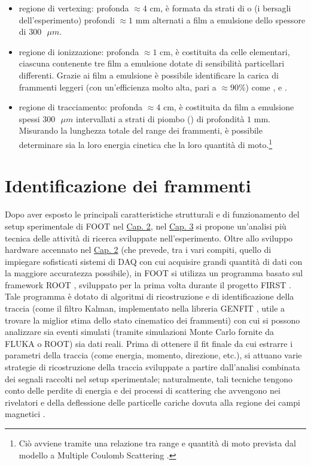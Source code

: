 \documentclass[12pt,a4paper,twoside]{report}
\begin{document}
	\begin{itemize}
		\item regione di vertexing: profonda $\approx4\mbox{ cm}$, è formata da strati di  o  (i bersagli dell'esperimento) profondi $\approx1\mbox{ mm}$ alternati a film a emulsione dello spessore di $300\mbox{ }\mu{m}$.
		\item regione di ionizzazione: profonda $\approx1\mbox{ cm}$, è costituita da celle elementari, ciascuna contenente tre film a emulsione dotate di sensibilità particellari differenti. Grazie ai film a emulsione è possibile identificare la carica di frammenti leggeri (con un'efficienza molto alta, pari a $\approx90\%$) come ,  e  \cite{deLellisConference}.
		\item regione di tracciamento: profonda $\approx4\mbox{ cm}$, è costituita da film a emulsione spessi $300\mbox{ }\mu{m}$ intervallati a strati di piombo () di profondità $1\mbox{ mm}$. Misurando la lunghezza totale del range dei frammenti, è possibile determinare sia la loro energia cinetica che la loro quantità di moto.\footnote{Ciò avviene tramite una relazione tra range e quantità di moto prevista dal modello a Multiple Coulomb Scattering \cite{articleAgafonova,DESERIO2003539}.}
	\end{itemize}
	
	\chapter{Identificazione dei frammenti}\label{cap:3}
	Dopo aver esposto le principali caratteristiche strutturali e di funzionamento del setup sperimentale di FOOT nel \hyperref[cap:2]{Cap. 2}, nel \hyperref[cap:3]{Cap. 3} si propone un'analisi più tecnica delle attività di ricerca sviluppate nell'esperimento. Oltre allo sviluppo hardware accennato nel \hyperref[cap:2]{Cap. 2} (che prevede, tra i vari compiti, quello di impiegare sofisticati sistemi di DAQ con cui acquisire grandi quantità di dati con la maggiore accuratezza possibile), in FOOT si utilizza un programma basato sul framework ROOT \cite{rene_brun}, sviluppato per la prima volta durante il progetto FIRST \cite{foot_cdr}. Tale programma è dotato di algoritmi di ricostruzione e di identificazione della traccia (come il filtro Kalman, implementato nella libreria GENFIT \cite{Rauch_2015}, utile a trovare la miglior stima dello stato cinematico dei frammenti) con cui si possono analizzare sia eventi simulati (tramite simulazioni Monte Carlo fornite da FLUKA o ROOT) sia dati reali. Prima di ottenere il fit finale da cui estrarre i parametri della traccia (come energia, momento, direzione, etc.), si attuano varie strategie di ricostruzione della traccia sviluppate a partire dall'analisi combinata dei segnali raccolti nel setup sperimentale; naturalmente, tali tecniche tengono conto delle perdite di energia e dei processi di scattering che avvengono nei rivelatori e della deflessione delle particelle cariche dovuta alla regione dei campi magnetici \cite{ridolfiArticle}.
	
\end{document}
